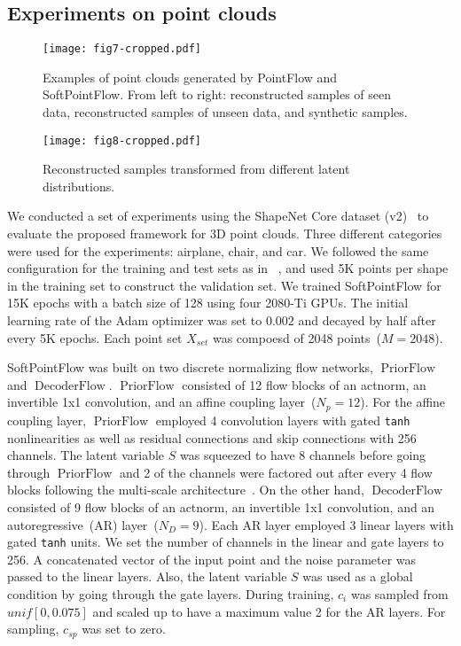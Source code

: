 \documentclass{article}
\DeclareMathOperator{\PriorFlow}{PriorFlow}
\DeclareMathOperator{\DecoderFlow}{DecoderFlow}
\begin{document}
\subsection{Experiments on point clouds}
\begin{figure}[t]
	\centering
	\texttt{[image: fig7-cropped.pdf]}
    \caption{Examples of point clouds generated by PointFlow and SoftPointFlow. From left to right: reconstructed samples of seen data, reconstructed samples of unseen data, and synthetic samples.}
	\label{fig:fig7}
\end{figure}
\begin{figure}[t]
	\centering
	\texttt{[image: fig8-cropped.pdf]}
    \caption{Reconstructed samples transformed from different latent distributions.}
	\label{fig:fig8}
\end{figure}
We conducted a set of experiments using the ShapeNet Core dataset (v2)~\citep{chang2015shapenet} to evaluate the proposed framework for 3D point clouds. Three different categories were used for the experiments: airplane, chair, and car. We followed the same configuration for the  training and test sets as in ~\citet{yang2019pointflow}, and used 5K points per shape in the training set to construct the validation set. We trained SoftPointFlow for 15K epochs with a batch size of 128 using four 2080-Ti GPUs. The initial learning rate of the Adam optimizer was set to $0.002$ and decayed by half after every 5K epochs. Each point set $X_{set}$ was compoesd of 2048 points~($M=2048$).


SoftPointFlow was built on two discrete normalizing flow networks, $\PriorFlow$ and $\DecoderFlow$. $\PriorFlow$ consisted of 12 flow blocks of an actnorm, an invertible 1x1 convolution, and an affine coupling layer~($N_{p}=12$). For the affine coupling layer, $\PriorFlow$ employed 4 convolution layers with gated \texttt{tanh} nonlinearities as well as residual connections and skip connections with 256 channels. The latent variable $S$ was squeezed to have 8 channels before going through $\PriorFlow$ and 2 of the channels were factored out after every 4 flow blocks following the multi-scale architecture~\citep{dinh2016density}. On the other hand, $\DecoderFlow$ consisted of 9 flow blocks of an actnorm, an invertible 1x1 convolution, and an autoregressive~(AR) layer~($N_{D}=9$). Each AR layer employed 3 linear layers with gated \texttt{tanh} units. We set the number of channels in the linear and gate layers to 256. A concatenated vector of the input point and the noise parameter was passed to the linear layers. Also, the latent variable $S$ was used as a global condition by going through the gate layers. During training, $c_{i}$ was sampled from $unif[0,0.075]$ and scaled up to have a maximum value 2 for the AR layers. For sampling, $c_{sp}$ was set to zero.
\end{document}
